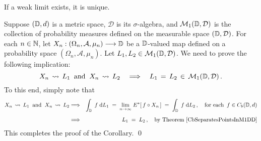 \vskip 0.75cm
\begin{corollary}\quad
If a weak limit exists, it is unique.
\end{corollary}
\proof
Suppose $(\mathbb{D},d)$ is a metric space, $\mathcal{D}$ is its $\sigma$-algebra, and
$\mathcal{M}_{1}(\mathbb{D},\mathcal{D})$ is the collection of probability measures
defined on the measurable space $(\mathbb{D},\mathcal{D})$.
For each $n \in \mathbb{N}$, let $X_{n} : (\Omega_{n},\mathcal{A},\mu_{n}) \longrightarrow \mathbb{D}$
be a $\mathbb{D}$-valued map defined on a probability space $(\Omega_{n},\mathcal{A},\mu_{n})$.
Let $L_{1}, L_{2} \in \mathcal{M}_{1}(\mathbb{D},\mathcal{D})$.
We need to prove the following implication:
\begin{equation*}
X_{n} \,\rightsquigarrow\, L_{1} \;\;\textnormal{and}\;\; X_{n} \,\rightsquigarrow\, L_{2}
\quad\Longrightarrow\quad
L_{1} \,=\, L_{2} \,\in\, \mathcal{M}_{1}(\mathbb{D},\mathcal{D})\,.
\end{equation*}
To this end, simply note that
\begin{eqnarray*}
X_{n} \,\wconverge\, L_{1} \;\;\textnormal{and}\;\; X_{n} \,\wconverge\, L_{2}
&\Longrightarrow&
	\int_{\D}\;f\;\d L_{1} \;=\; \underset{n\rightarrow\infty}{\lim}\;E^{*}\!\left[\,f \circ X_{n}\,\right] \;=\; \int_{\D}\;f\;\d L_{2}\,,
	\quad
	\textnormal{for each \,$f \in C_{b}(\D,d)$}
\\
&\overset{{\color{white}\vert}}{\Longrightarrow}&
	L_{1} \;=\; L_{2}\,,
	\quad	
	\textnormal{by Theorem \ref{CbSeparatesPointsInM1DD}}
\end{eqnarray*}
This completes the proof of the Corollary.
\qed


\renewcommand{\theenumi}{\roman{enumi}}
\renewcommand{\labelenumi}{\textnormal{(\theenumi)}$\;\;$}

